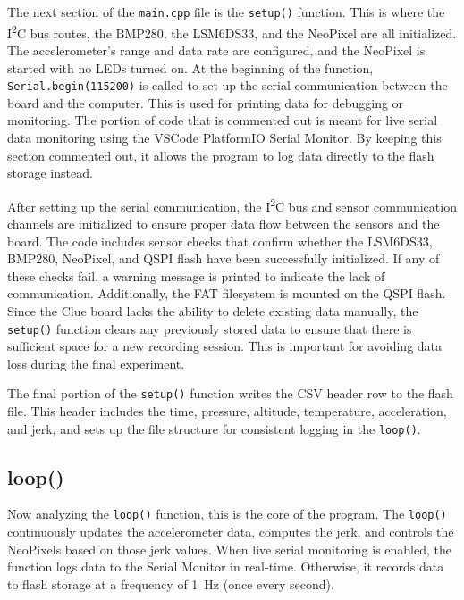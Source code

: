 \documentclass[12pt]{report}
\begin{document}
The next section of the \texttt{main.cpp} file is the \texttt{setup()} function. This is where the I\textsuperscript{2}C bus routes, the BMP280, the LSM6DS33, and the NeoPixel are all initialized. The accelerometer's range and data rate are configured, and the NeoPixel is started with no LEDs turned on. At the beginning of the function, \texttt{Serial.begin(115200)} is called to set up the serial communication between the board and the computer. This is used for printing data for debugging or monitoring. The portion of code that is commented out is meant for live serial data monitoring using the VSCode PlatformIO Serial Monitor. By keeping this section commented out, it allows the program to log data directly to the flash storage instead. \newline

After setting up the serial communication, the I\textsuperscript{2}C bus and sensor communication channels are initialized to ensure proper data flow between the sensors and the board. The code includes sensor checks that confirm whether the LSM6DS33, BMP280, NeoPixel, and QSPI flash have been successfully initialized. If any of these checks fail, a warning message is printed to indicate the lack of communication. Additionally, the FAT filesystem is mounted on the QSPI flash. Since the Clue board lacks the ability to delete existing data manually, the \texttt{setup()} function clears any previously stored data to ensure that there is sufficient space for a new recording session. This is important for avoiding data loss during the final experiment. \newline

The final portion of the \texttt{setup()} function writes the CSV header row to the flash file. This header includes the time, pressure, altitude, temperature, acceleration, and jerk, and sets up the file structure for consistent logging in the \texttt{loop()}.

\subsection*{loop()}
Now analyzing the \texttt{loop()} function, this is the core of the program. The \texttt{loop()} continuously updates the accelerometer data, computes the jerk, and controls the NeoPixels based on those jerk values. When live serial monitoring is enabled, the function logs data to the Serial Monitor in real-time. Otherwise, it records data to flash storage at a frequency of 1~Hz (once every second). \newline
\end{document}
